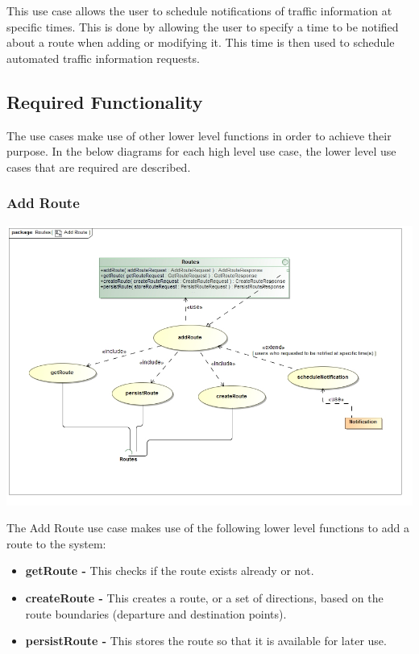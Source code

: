 \documentclass[a4paper,12pt]{article}
\begin{document}
This use case allows the user to schedule notifications of traffic information at specific times. This is done by allowing the user to specify a time to be notified about a route when adding or modifying it. This time is then used to schedule automated traffic information requests.
\subsection{Required Functionality}
The use cases make use of other lower level functions in order to achieve their purpose. In the below diagrams for each high level use case, the lower level use cases that are required are described.
\subsubsection{Add Route}
\includegraphics[width=\textwidth]{images/Add_Route.jpg}

The Add Route use case makes use of the following lower level functions to add a route to the system:
\begin{itemize}
\item \textbf{getRoute -} This checks if the route exists already or not.
\item \textbf{createRoute -} This creates a route, or a set of directions, based on the route boundaries (departure and destination points).
\item \textbf{persistRoute -} This stores the route so that it is available for later use.
\end{itemize}
\end{document}
